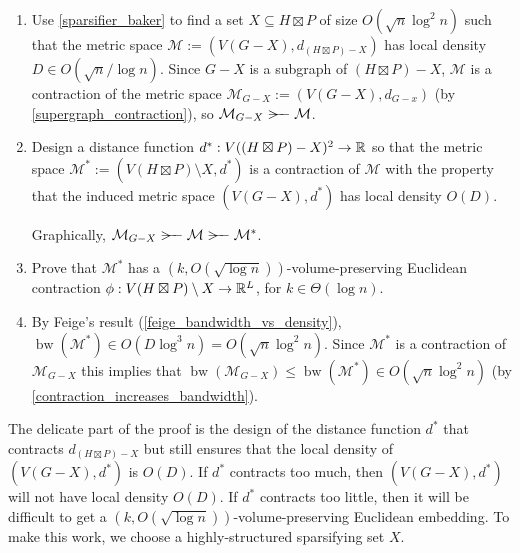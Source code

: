 \documentclass{patmorin}
\renewcommand{\le}{\leqslant}
\DeclareMathOperator{\bw}{bw}
\begin{document}
\begin{enumerate}
  \item Use \cref{sparsifier_baker} to find a set $X\subseteq H\boxtimes P$ of size $O(\sqrt{n}\log^2 n)$ such that the metric space $\mathcal{M}:=(V(G-X),d_{(H\boxtimes P)-X})$ has local density $D\in O(\sqrt{n}/\log n)$.  Since $G-X$ is a subgraph of $(H\boxtimes P)-X$, $\mathcal{M}$ is a contraction of the metric space $\mathcal{M}_{G-X}:=(V(G-X),d_{G-x})$ (by \cref{supergraph_contraction}), so $\mathcal{M}_{G-X}\rightbroom\mathcal{M}$.

  \item Design a distance function $d^*:V((H\boxtimes P)-X)^2\to\mathbb{R}$ so that the metric space $\mathcal{M}^*:=(V(H\boxtimes P)\setminus X,d^*)$ is a contraction of $\mathcal{M}$ with the property that the induced metric space $(V(G-X),d^*)$ has local density $O(D)$.

  Graphically, $\mathcal{M}_{G-X}\rightbroom\mathcal{M}\rightbroom\mathcal{M}^*$.

  \item Prove that $\mathcal{M}^*$ has a $(k,O(\sqrt{\log n}))$-volume-preserving Euclidean contraction $\phi:V(H\boxtimes P)\setminus X\to\mathbb{R}^L$, for $k\in\Theta(\log n)$.


  \item
   By Feige's result (\cref{feige_bandwidth_vs_density}),  $\bw(\mathcal{M}^*)\in O(D\log^3 n)=O(\sqrt{n}\log^2 n)$.  Since $\mathcal{M}^*$ is a contraction of $\mathcal{M}_{G-X}$ this implies that $\bw(\mathcal{M}_{G-X}) \le \bw(\mathcal{M}^*)\in O(\sqrt{n}\log^2 n)$ (by \cref{contraction_increases_bandwidth}).
\end{enumerate}

The delicate part of the proof is the design of the distance function $d^*$ that contracts $d_{(H\boxtimes P)-X}$ but still ensures that the local density of $(V(G-X),d^*)$ is $O(D)$. If $d^*$ contracts too much, then $(V(G-X),d^*)$ will not have local density $O(D)$. If $d^*$ contracts too little, then it will be difficult to get a $(k,O(\sqrt{\log n}))$-volume-preserving Euclidean embedding. To make this work, we choose a highly-structured sparsifying set $X$.
\end{document}
